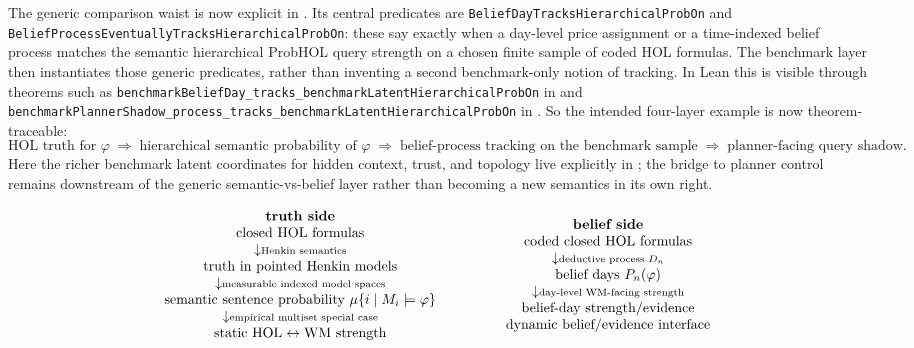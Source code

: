 \documentclass[11pt,openany]{report}
\begin{document}
The generic comparison waist is now explicit in
.  Its central
predicates are \texttt{BeliefDayTracksHierarchicalProbOn} and
\texttt{BeliefProcessEventuallyTracksHierarchicalProbOn}: these say exactly
when a day-level price assignment or a time-indexed belief process matches the
semantic hierarchical ProbHOL query strength on a chosen finite sample of coded
HOL formulas.  The benchmark layer then instantiates those generic predicates,
rather than inventing a second benchmark-only notion of tracking.  In Lean this
is visible through theorems such as
\texttt{benchmarkBeliefDay\_tracks\_benchmarkLatentHierarchicalProbOn} in
 and
\texttt{benchmarkPlannerShadow\_process\_tracks\_benchmarkLatentHierarchicalProbOn}
in .  So the intended
four-layer example is now theorem-traceable:
\[
\text{HOL truth for } \varphi
\;\Longrightarrow\;
\text{hierarchical semantic probability of } \varphi
\;\Longrightarrow\;
\text{belief-process tracking on the benchmark sample}
\;\Longrightarrow\;
\text{planner-facing query shadow}.
\]
Here the richer benchmark latent coordinates for hidden context, trust, and
topology live explicitly in
; the bridge
to planner control remains downstream of the generic semantic-vs-belief layer
rather than becoming a new semantics in its own right.

\[
\begin{array}{c@{\qquad\qquad}c}
\begin{array}{c}
\textbf{truth side} \\
\text{closed HOL formulas} \\
\downarrow\scriptstyle{\text{Henkin semantics}} \\
\text{truth in pointed Henkin models} \\
\downarrow\scriptstyle{\text{measurable indexed model spaces}} \\
\text{semantic sentence probability } \mu\{i \mid M_i \models \varphi\} \\
\downarrow\scriptstyle{\text{empirical multiset special case}} \\
\text{static HOL}\leftrightarrow\text{WM strength}
\end{array}
&
\begin{array}{c}
\textbf{belief side} \\
\text{coded closed HOL formulas} \\
\downarrow\scriptstyle{\text{deductive process } D_n} \\
\text{belief days } P_n(\varphi) \\
\downarrow\scriptstyle{\text{day-level WM-facing strength}} \\
\text{belief-day strength/evidence} \\
\text{dynamic belief/evidence interface}
\end{array}
\end{array}
\]
\end{document}
